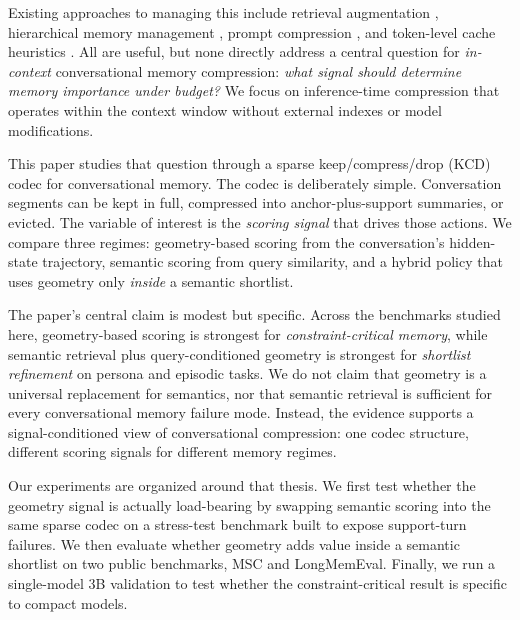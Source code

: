 \documentclass[11pt]{article}
\begin{document}
Existing approaches to managing this include retrieval augmentation \cite{rag}, hierarchical memory management \cite{memgpt}, prompt compression \cite{longllmlingua}, and token-level cache heuristics \cite{h2o,snapkv}. All are useful, but none directly address a central question for \emph{in-context} conversational memory compression: \emph{what signal should determine memory importance under budget?} We focus on inference-time compression that operates within the context window without external indexes or model modifications.

This paper studies that question through a sparse keep/compress/drop (KCD) codec for conversational memory. The codec is deliberately simple. Conversation segments can be kept in full, compressed into anchor-plus-support summaries, or evicted. The variable of interest is the \emph{scoring signal} that drives those actions. We compare three regimes: geometry-based scoring from the conversation's hidden-state trajectory, semantic scoring from query similarity, and a hybrid policy that uses geometry only \emph{inside} a semantic shortlist.

The paper's central claim is modest but specific. Across the benchmarks studied here, geometry-based scoring is strongest for \emph{constraint-critical memory}, while semantic retrieval plus query-conditioned geometry is strongest for \emph{shortlist refinement} on persona and episodic tasks. We do not claim that geometry is a universal replacement for semantics, nor that semantic retrieval is sufficient for every conversational memory failure mode. Instead, the evidence supports a signal-conditioned view of conversational compression: one codec structure, different scoring signals for different memory regimes.

Our experiments are organized around that thesis. We first test whether the geometry signal is actually load-bearing by swapping semantic scoring into the same sparse codec on a stress-test benchmark built to expose support-turn failures. We then evaluate whether geometry adds value inside a semantic shortlist on two public benchmarks, MSC and LongMemEval. Finally, we run a single-model 3B validation to test whether the constraint-critical result is specific to compact models.
\end{document}
